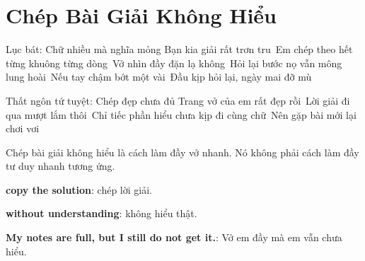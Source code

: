 \chapter{Chép Bài Giải Không Hiểu}

\begin{lucbatbox}{Lục bát: Chữ nhiều mà nghĩa mỏng}
Bạn kia giải rất trơn tru\
Em chép theo hết từng khuông từng dòng\
Vở nhìn đầy đặn lạ không\
Hỏi lại bước nọ vẫn mông lung hoài\
Nếu tay chậm bớt một vài\
Đầu kịp hỏi lại, ngày mai đỡ mù
\end{lucbatbox}

\begin{tutuyetbox}{Thất ngôn tứ tuyệt: Chép đẹp chưa đủ}
Trang vở của em rất đẹp rồi\
Lời giải đi qua mượt lắm thôi\
Chỉ tiếc phần hiểu chưa kịp đi cùng chữ\
Nên gặp bài mới lại chơi vơi
\end{tutuyetbox}

\begin{ghichu}
Chép bài giải không hiểu là cách làm đầy vở nhanh. Nó không phải cách làm đầy tư duy nhanh tương ứng.
\end{ghichu}

\begin{englishnote}
\textbf{copy the solution}: chép lời giải.\par
\textbf{without understanding}: không hiểu thật.\par
\textbf{My notes are full, but I still do not get it.}: Vở em đầy mà em vẫn chưa hiểu.
\end{englishnote}